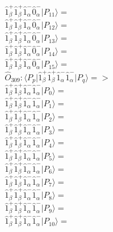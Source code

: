 \documentclass[14pt]{article}
\begin{document}
    $ \hat{1}_{\beta}^{+}\hat{1}_{\beta}^{+}\hat{1}_{\alpha}^{-}\hat{0}_{\alpha}^{-} \vert{P_{11}}\rangle =  $ \\ 
    $ \hat{1}_{\beta}^{+}\hat{1}_{\beta}^{+}\hat{1}_{\alpha}^{-}\hat{0}_{\alpha}^{-} \vert{P_{12}}\rangle =  $ \\ 
    $ \hat{1}_{\beta}^{+}\hat{1}_{\beta}^{+}\hat{1}_{\alpha}^{-}\hat{0}_{\alpha}^{-} \vert{P_{13}}\rangle =  $ \\ 
    $ \hat{1}_{\beta}^{+}\hat{1}_{\beta}^{+}\hat{1}_{\alpha}^{-}\hat{0}_{\alpha}^{-} \vert{P_{14}}\rangle =  $ \\ 
    $ \hat{1}_{\beta}^{+}\hat{1}_{\beta}^{+}\hat{1}_{\alpha}^{-}\hat{0}_{\alpha}^{-} \vert{P_{15}}\rangle =  $ \\ 
    
    $\hat{O}_{309}:  \langle{P_p}\vert \hat{1}_{\beta}^{+}\hat{1}_{\beta}^{+}\hat{1}_{\alpha}^{-}\hat{1}_{\alpha}^{-} \vert{P_q}\rangle => $ \\ 
    $ \hat{1}_{\beta}^{+}\hat{1}_{\beta}^{+}\hat{1}_{\alpha}^{-}\hat{1}_{\alpha}^{-} \vert{P_{0}}\rangle =  $ \\ 
    $ \hat{1}_{\beta}^{+}\hat{1}_{\beta}^{+}\hat{1}_{\alpha}^{-}\hat{1}_{\alpha}^{-} \vert{P_{1}}\rangle =  $ \\ 
    $ \hat{1}_{\beta}^{+}\hat{1}_{\beta}^{+}\hat{1}_{\alpha}^{-}\hat{1}_{\alpha}^{-} \vert{P_{2}}\rangle =  $ \\ 
    $ \hat{1}_{\beta}^{+}\hat{1}_{\beta}^{+}\hat{1}_{\alpha}^{-}\hat{1}_{\alpha}^{-} \vert{P_{3}}\rangle =  $ \\ 
    $ \hat{1}_{\beta}^{+}\hat{1}_{\beta}^{+}\hat{1}_{\alpha}^{-}\hat{1}_{\alpha}^{-} \vert{P_{4}}\rangle =  $ \\ 
    $ \hat{1}_{\beta}^{+}\hat{1}_{\beta}^{+}\hat{1}_{\alpha}^{-}\hat{1}_{\alpha}^{-} \vert{P_{5}}\rangle =  $ \\ 
    $ \hat{1}_{\beta}^{+}\hat{1}_{\beta}^{+}\hat{1}_{\alpha}^{-}\hat{1}_{\alpha}^{-} \vert{P_{6}}\rangle =  $ \\ 
    $ \hat{1}_{\beta}^{+}\hat{1}_{\beta}^{+}\hat{1}_{\alpha}^{-}\hat{1}_{\alpha}^{-} \vert{P_{7}}\rangle =  $ \\ 
    $ \hat{1}_{\beta}^{+}\hat{1}_{\beta}^{+}\hat{1}_{\alpha}^{-}\hat{1}_{\alpha}^{-} \vert{P_{8}}\rangle =  $ \\ 
    $ \hat{1}_{\beta}^{+}\hat{1}_{\beta}^{+}\hat{1}_{\alpha}^{-}\hat{1}_{\alpha}^{-} \vert{P_{9}}\rangle =  $ \\ 
    $ \hat{1}_{\beta}^{+}\hat{1}_{\beta}^{+}\hat{1}_{\alpha}^{-}\hat{1}_{\alpha}^{-} \vert{P_{10}}\rangle =  $ \\ 
\end{document}
